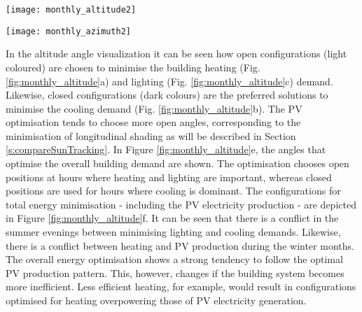 	\begin{figure*}
		\begin{center}
		\texttt{[image: monthly\_altitude2]}
		\caption{Carpet plots detailing the optimal altitude angles to minimise the (a) heating demand, (b) cooling demand, (c) lighting demand, and (d) maximise PV electricity production. Figure (e) details the combinations for optimum building thermal management without PV production, (f) also includes the PV production. Small angles correspond to closed positions, whereas large angles represent open positions. The corresponding azimuth angles for each hour can be seen in the following Figure (\ref{fig:monthly_azimuth}).}
		\label{fig:monthly_altitude}
		\end{center}
	\end{figure*}

	\begin{figure*}
		\begin{center}
		\texttt{[image: monthly\_azimuth2]}
		\caption{Carpet plots detailing the optimal azimuth angles to minimise the (a) heating demand, (b) cooling demand, (c) lighting demand, and (d) maximise PV electricity production. Figure (e) details the combinations for optimum building thermal management without PV production, (f) also includes the PV production. Negative angles correspond to the panels facing west, whereas positive angles represent east-facing panels. The corresponding altitude angles for each hour can be seen in the previous Figure (\ref{fig:monthly_altitude}).}
		\label{fig:monthly_azimuth}
		\end{center}
	\end{figure*}

	In the altitude angle visualization it can be seen how open configurations (light coloured) are chosen to minimise the building heating (Fig. \ref{fig:monthly_altitude}a) and lighting (Fig. \ref{fig:monthly_altitude}c) demand. Likewise, closed configurations (dark colours) are the preferred solutions to minimise the cooling demand (Fig. \ref{fig:monthly_altitude}b). The PV optimisation tends to choose more open angles, corresponding to the minimisation of longitudinal shading as will be described in Section \ref{s:compareSunTracking}. In Figure \ref{fig:monthly_altitude}e, the angles that optimise the overall building demand are shown. The optimisation chooses open positions at hours where heating and lighting are important, whereas closed positions are used for hours where cooling is dominant. The configurations for total energy minimisation - including the PV electricity production - are depicted in Figure \ref{fig:monthly_altitude}f. It can be seen that there is a conflict in the summer evenings between minimising lighting and cooling demands. Likewise, there is a conflict between heating and PV production during the winter months. The overall energy optimisation shows a strong tendency to follow the optimal PV production pattern. This, however, changes if the building system becomes more inefficient. Less efficient heating, for example, would result in configurations optimised for heating overpowering those of PV electricity generation.

